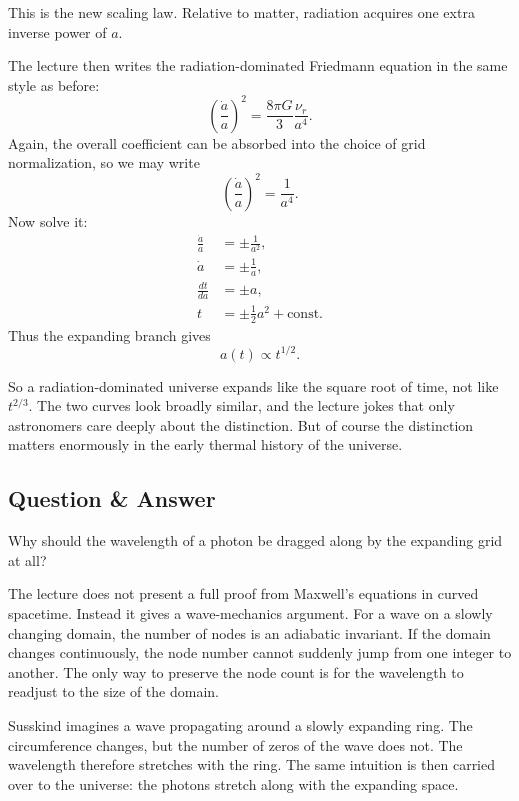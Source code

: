 This is the new scaling law. Relative to matter, radiation acquires one extra inverse power of \(a\).

The lecture then writes the radiation-dominated Friedmann equation in the same style as before:
\begin{equation}
\left(\frac{\dot a}{a}\right)^2
=
\frac{8\pi G}{3}\frac{\nu_r}{a^4}.
\end{equation}
Again, the overall coefficient can be absorbed into the choice of grid normalization, so we may write
\begin{equation}
\left(\frac{\dot a}{a}\right)^2=\frac{1}{a^4}.
\end{equation}
Now solve it:
\begin{align}
\frac{\dot a}{a} &= \pm \frac{1}{a^2},\\
\dot a &= \pm \frac{1}{a},\\
\frac{dt}{da} &= \pm a,\\
t &= \pm \frac{1}{2}a^2+\text{const}.
\end{align}
Thus the expanding branch gives
\begin{equation}
a(t)\propto t^{1/2}.
\end{equation}

So a radiation-dominated universe expands like the square root of time, not like \(t^{2/3}\). The two curves look broadly similar, and the lecture jokes that only astronomers care deeply about the distinction. But of course the distinction matters enormously in the early thermal history of the universe.

\subsection{Question \& Answer}

Why should the wavelength of a photon be dragged along by the expanding grid at all?

The lecture does not present a full proof from Maxwell's equations in curved spacetime. Instead it gives a wave-mechanics argument. For a wave on a slowly changing domain, the number of nodes is an adiabatic invariant. If the domain changes continuously, the node number cannot suddenly jump from one integer to another. The only way to preserve the node count is for the wavelength to readjust to the size of the domain.

Susskind imagines a wave propagating around a slowly expanding ring. The circumference changes, but the number of zeros of the wave does not. The wavelength therefore stretches with the ring. The same intuition is then carried over to the universe: the photons stretch along with the expanding space.

